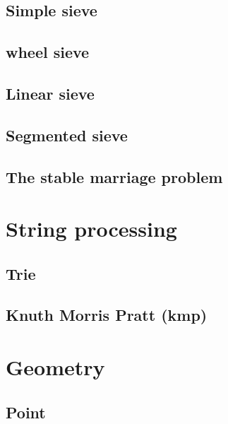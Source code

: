 \subsection{Simple sieve}
\raggedbottom
\hrulefill
\subsection{wheel sieve}
\raggedbottom
\hrulefill
\subsection{Linear sieve}
\raggedbottom
\hrulefill
\subsection{Segmented sieve}
\raggedbottom
\hrulefill
\subsection{The stable marriage problem}
\raggedbottom
\hrulefill


\section{String processing}
\subsection{Trie}
\raggedbottom
\hrulefill
\subsection{Knuth Morris Pratt (kmp)}
\raggedbottom
\hrulefill


\section{Geometry}
\subsection{Point}
\raggedbottom
\hrulefill


